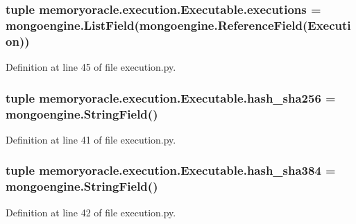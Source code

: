 \subsubsection[{executions}]{\setlength{\rightskip}{0pt plus 5cm}tuple memoryoracle.\+execution.\+Executable.\+executions = mongoengine.\+List\+Field(mongoengine.\+Reference\+Field({\bf Execution}))\hspace{0.3cm}{\ttfamily [static]}}\label{classmemoryoracle_1_1execution_1_1Executable_a445e571531520c3ec32754988b4d7ee6}


Definition at line 45 of file execution.\+py.

\hypertarget{classmemoryoracle_1_1execution_1_1Executable_af209643fc8bba25bb96282463a2274d7}{}
\subsubsection[{hash\+\_\+sha256}]{\setlength{\rightskip}{0pt plus 5cm}tuple memoryoracle.\+execution.\+Executable.\+hash\+\_\+sha256 = mongoengine.\+String\+Field()\hspace{0.3cm}{\ttfamily [static]}}\label{classmemoryoracle_1_1execution_1_1Executable_af209643fc8bba25bb96282463a2274d7}


Definition at line 41 of file execution.\+py.

\hypertarget{classmemoryoracle_1_1execution_1_1Executable_aaa57eabb3dec08378d484a6f7f519fe2}{}
\subsubsection[{hash\+\_\+sha384}]{\setlength{\rightskip}{0pt plus 5cm}tuple memoryoracle.\+execution.\+Executable.\+hash\+\_\+sha384 = mongoengine.\+String\+Field()\hspace{0.3cm}{\ttfamily [static]}}\label{classmemoryoracle_1_1execution_1_1Executable_aaa57eabb3dec08378d484a6f7f519fe2}


Definition at line 42 of file execution.\+py.

\hypertarget{classmemoryoracle_1_1execution_1_1Executable_afd44dfe3eb583f3c185b66a619e7923b}{}
